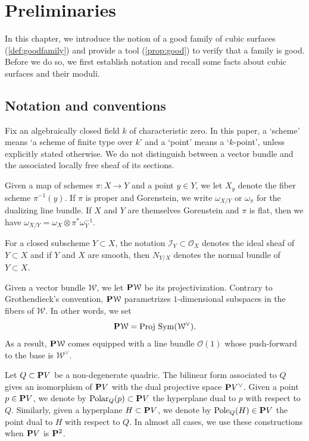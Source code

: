 \documentclass[12pt,reqno]{amsart}
\renewcommand{\k}{k}
\DeclareMathOperator{\Polar}{Polar}
\DeclareMathOperator{\Pole}{Pole}
\renewcommand{\to}{{\longrightarrow}}
\numberwithin{equation}{section}
\renewcommand{\O}{\mathcal O}
\newcommand{\Proj}{{\text{\rm Proj}\,}}
\begin{document}
  




\section{Preliminaries}
\label{sec:good}

In this chapter, we introduce the notion of a good family of cubic
surfaces (\autoref{def:goodfamily}) and provide a tool
(\autoref{prop:good}) to verify that a family is good.  Before we do
so, we first establish notation and recall some facts about cubic surfaces and their moduli.
\subsection{Notation and conventions}
\label{sec:notation-conventions}
Fix an algebraically closed field $\k$ of characteristic zero.  In
this paper, a `scheme' means `a scheme of finite type over $\k$' and a
`point' means a `$\k$-point', unless explicitly stated otherwise.  We
do not distinguish between a vector bundle and the associated locally
free sheaf of its sections.

Given a map of schemes $\pi \colon X \to Y$ and a point $y \in Y$, we
let $X_y$ denote the fiber scheme $\pi^{-1}(y)$.  If $\pi$ is proper
and Gorenstein, we write $\omega_{X/Y}$ or $\omega_\pi$ for the
dualizing line bundle.  If $X$ and $Y$ are themselves Gorenstein and
$\pi$ is flat, then we have
$\omega_{X/Y} = \omega_X \otimes \pi^*\omega_Y^{-1}$.

For a closed subscheme $Y \subset X$, the notation $\mathcal I_Y \subset \O_X$ denotes the ideal sheaf of $Y \subset X$ and if $Y$ and $X$ are smooth, then $N_{Y/X}$ denotes the normal bundle of $Y \subset X$.

Given a vector bundle $\mathcal W$, we let $\P \mathcal W$ be its
projectivization.  Contrary to Grothendieck's convention,
$\P \mathcal W$ parametrizes $1$-dimensional subspaces in the fibers
of $\mathcal W$.  In other words, we set
\[ \P \mathcal W = \Proj \Sym(\mathcal W^\vee).\] As a result,
$\P \mathcal W$ comes equipped with a line bundle $\O(1)$ whose
push-forward to the base is $\mathcal W^\vee$.

Let $Q \subset \P V$ be a non-degenerate quadric.  The bilinear form
associated to $Q$ gives an isomorphism of $\P V$ with the dual
projective space $\P V^\vee$.  Given a point $p \in \P V$, we denote
by $\Polar_Q(p) \subset \P V$ the hyperplane dual to $p$ with respect to
$Q$. Similarly, given a hyperplane $H \subset \P V$, we denote by
$\Pole_Q(H) \in \P V$ the point dual to $H$ with respect to $Q$.  In
almost all cases, we use these constructions when $\P V$ is $\P^2$.
\end{document}
